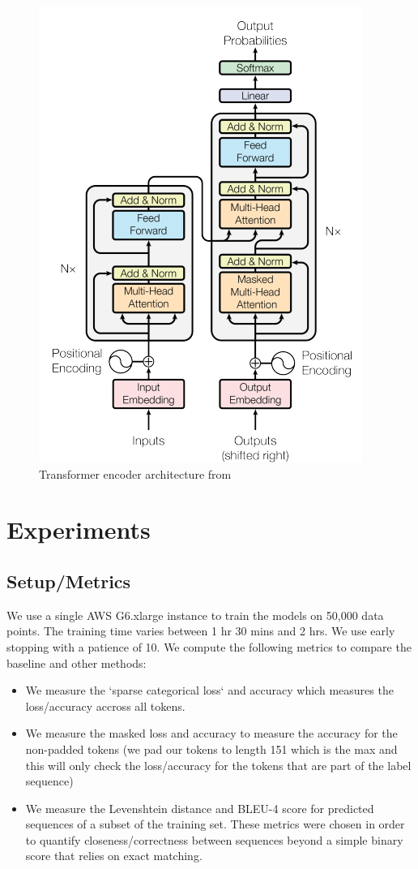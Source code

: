 \documentclass{article}
\begin{document}
\begin{figure}[H]
	\centering \includegraphics[scale=0.5]{transformer_decoder.png}
	\caption{Transformer encoder architecture from \cite{transformer}}
\end{figure}


\section{Experiments}

\subsection{Setup/Metrics}

We use a single AWS G6.xlarge instance to train the models on 50,000 data points. The training time varies between  1 hr 30 mins and 2 hrs. We use early stopping with a patience of 10. We compute the following metrics to compare the baseline and other methods:

\begin{itemize}
  \item We measure the `sparse categorical loss` and accuracy which measures the loss/accuracy accross all tokens. 
  \item We measure the masked loss and accuracy to measure the accuracy for the non-padded tokens (we pad our tokens to length 151 which is the max and this will only check the loss/accuracy for the tokens that are part of the label sequence)
  \item We measure the Levenshtein distance and BLEU-4 score for predicted sequences of a subset of the training set. These metrics were chosen in order to quantify closeness/correctness between sequences beyond a simple binary score that relies on exact matching.
\end{itemize}
\end{document}
